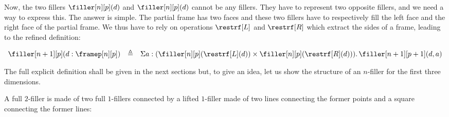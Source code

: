 \documentclass[10pt]{art.cls/art}
\newcommand{\defeq}{\ensuremath{\triangleq}}
\begin{document}
Now, the two fillers $\filler[n][p](d)$ and $\filler[n][p](d)$ cannot be any fillers. They have to represent two opposite fillers, and we need a way to express this. The answer is simple. The partial frame has two faces and these two fillers have to respectively fill the left face and the right face of the partial frame. We thus have to rely on operations $\restrf[L]$ and $\restrf[R]$ which extract the sides of a frame, leading to the refined definition:

\begin{equation*}
  \begin{array}{lll}
    \filler[n+1][p](d:\framep[n][p]) & \defeq & \Sigma a:(\filler[n][p](\restrf[L](d)) \times \filler[n][p](\restrf[R](d))) .\, \filler[n+1][p+1](d,a)
  \end{array}
\end{equation*}

The full explicit definition shall be given in the next sections but, to give an idea, let us show the structure of an $n$-filler for the first three dimensions.

A full $2$-filler is made of two full $1$-fillers connected by a lifted $1$-filler made of two lines connecting the former points and a square connecting the former lines:
\end{document}

